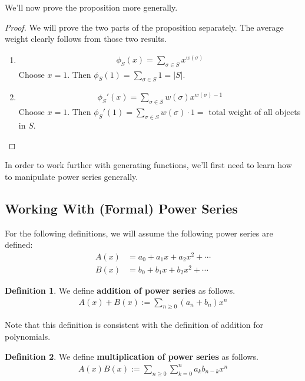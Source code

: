 \documentclass[]{article}
\theoremstyle{definition}
\newtheorem{defn}{Definition}[section]
\begin{document}
			We'll now prove the proposition more generally.
			\begin{proof}
				We will prove the two parts of the proposition separately. The average weight clearly follows from those two results.
				\begin{enumerate}
					\item 
						\begin{align*}
							\phi_S(x) = \sum_{\sigma \in S} x^{w(\sigma)}
						\end{align*}
						Choose $x = 1$. Then $\phi_S(1) = \sum_{\sigma \in S} 1 = |S|$.

					\item 
						\begin{align*}
							\phi_S'(x) = \sum_{\sigma \in S} w(\sigma)x^{w(\sigma) - 1}
						\end{align*}
						Choose $x = 1$. Then $\phi_S'(1) = \sum_{\sigma \in S} w(\sigma) \cdot 1 = $ total weight of all objects in $S$.
				\end{enumerate}
			\end{proof}

			In order to work further with generating functions, we'll first need to learn how to manipulate power series generally.
		\subsection{Working With (Formal) Power Series}
			For the following definitions, we will assume the following power series are defined:
			\begin{align*}
				A(x) &= a_0 + a_1x + a_2x^2 + \cdots \\
				B(x) &= b_0 + b_1x + b_2x^2 + \cdots
			\end{align*}

			\begin{defn}
				We define \textbf{addition of power series} as follows.
				\begin{align*}
					A(x) + B(x) := \sum_{n \ge 0} (a_n + b_n)x^n
				\end{align*}

				Note that this definition is consistent with the definition of addition for polynomials.
			\end{defn}

			\begin{defn}
				We define \textbf{multiplication of power series} as follows.
				\begin{align*}
					A(x)B(x) := \sum_{n \ge 0} \sum_{k = 0}^{n} a_k b_{n - k}x^n
				\end{align*}
			\end{defn}
\end{document}

